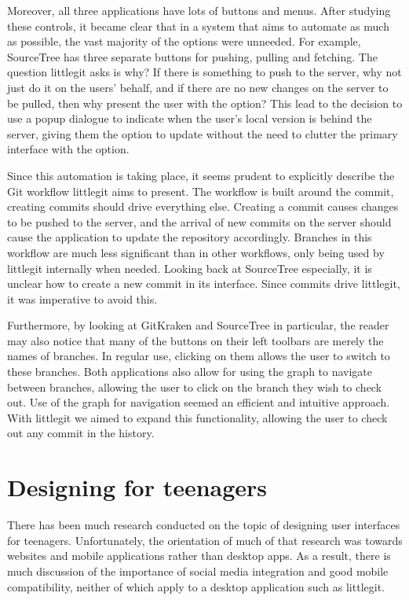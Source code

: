 Moreover, all three applications have lots of buttons and menus. After studying these controls, it became clear that in a system that aims to automate as much as possible, the vast majority of the options were unneeded. For example, SourceTree has three separate buttons for pushing, pulling and fetching. The question littlegit asks is why? If there is something to push to the server, why not just do it on the users' behalf, and if there are no new changes on the server to be pulled, then why present the user with the option? This lead to the decision to use a popup dialogue to indicate when the user's local version is behind the server, giving them the option to update without the need to clutter the primary interface with the option.

Since this automation is taking place, it seems prudent to explicitly describe the Git workflow littlegit aims to present. The workflow is built around the commit, creating commits should drive everything else. Creating a commit causes changes to be pushed to the server, and the arrival of new commits on the server should cause the application to update the repository accordingly. Branches in this workflow are much less significant than in other workflows, only being used by littlegit internally when needed. Looking back at SourceTree especially, it is unclear how to create a new commit in its interface. Since commits drive littlegit, it was imperative to avoid this.

Furthermore, by looking at GitKraken and SourceTree in particular, the reader may also notice that many of the buttons on their left toolbars are merely the names of branches. In regular use, clicking on them allows the user to switch to these branches. Both applications also allow for using the graph to navigate between branches, allowing the user to click on the branch they wish to check out. Use of the graph for navigation seemed an efficient and intuitive approach. With littlegit we aimed to expand this functionality, allowing the user to check out any commit in the history.

\section {Designing for teenagers}\label{sec:teen-design}

There has been much research conducted on the topic of designing user interfaces for teenagers. Unfortunately, the orientation of much of that research was towards websites and mobile applications rather than desktop apps. As a result, there is much discussion of the importance of social media integration and good mobile compatibility, neither of which apply to a desktop application such as littlegit.

